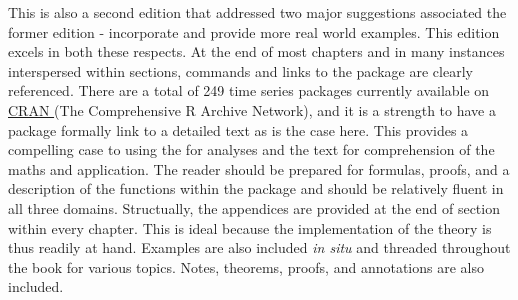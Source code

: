 \documentclass[bookreview]{jss}
\begin{document}
This is also a second edition that addressed two major suggestions associated the former edition - incorporate  and provide more real world examples. This edition excels in both these respects. At the end of most chapters and in many instances interspersed within sections,  commands and links to the package  are clearly referenced. There are a total of 249 time series packages currently available on \href{https://cran.r-project.org/web/views/TimeSeries.html}{CRAN }(The Comprehensive R Archive Network), and it is a strength to have a package formally link to a detailed text as is the case here. This provides a compelling case to using the  for analyses and the text for comprehension of the maths and application. The reader should be prepared for formulas, proofs, and a description of the functions within the  package  and should be relatively fluent in all three domains. Structually, the appendices are provided at the end of section within every chapter. This is ideal because the implementation of the theory is thus readily at hand. Examples are also included \textit{in situ} and threaded throughout the book for various topics. Notes, theorems, proofs, and annotations are also included.  \newline
\end{document}
